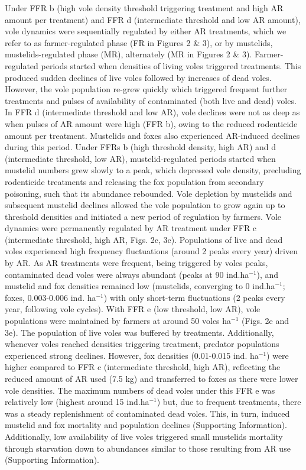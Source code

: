 \documentclass[11pt]{article}
\begin{document}
Under FFR b (high vole density threshold triggering treatment and high AR amount per treatment) and FFR d (intermediate threshold and low AR amount), vole dynamics were sequentially regulated by either AR treatments, which we refer to as farmer-regulated phase (FR in Figures 2 \& 3), or by mustelids, mustelids-regulated phase (MR), alternately (MR in Figures 2 \& 3). Farmer-regulated periods started when densities of living voles triggered treatments. This produced sudden declines of live voles followed by increases of dead voles. However, the vole population re-grew quickly which triggered frequent further treatments and pulses of availability of contaminated (both live and dead) voles. In FFR d (intermediate threshold and low AR), vole declines were not as deep as when pulses of AR amount were high (FFR b), owing to the reduced rodenticide amount per treatment. Mustelids and foxes also experienced AR-induced declines during this period. Under FFRs b (high threshold density, high AR) and d (intermediate threshold, low AR), mustelid-regulated periods started when mustelid numbers grew slowly to a peak, which depressed vole density, precluding rodenticide treatments and releasing the fox population from secondary poisoning, such that its abundance rebounded. Vole depletion by mustelids and subsequent mustelid declines allowed the vole population to grow again up to threshold densities and initiated a new period of regulation by farmers.
Vole dynamics were permanently regulated by AR treatment under FFR c (intermediate threshold, high AR, Figs. 2c, 3c). Populations of live and dead voles experienced high frequency fluctuations (around 2 peaks every year) driven by AR. As AR treatments were frequent, being triggered by voles peaks, contaminated dead voles were always abundant (peaks at 90 ind.ha$^{-1}$), and mustelid and fox densities remained low (mustelids, converging to 0 ind.ha$^{-1}$; foxes, 0.003-0.006 ind. ha$^{-1}$) with only short-term fluctuations (2 peaks every year, following vole cycles).
With FFR e (low threshold, low AR), vole populations were maintained by farmers at around 50 voles ha$^{-1}$ (Figs. 2e and 3e). The population of live voles was buffered by treatments. Additionally, whenever voles reached densities triggering treatment, predator populations experienced strong declines. However, fox densities (0.01-0.015 ind. ha$^{-1}$) were higher compared to FFR c (intermediate threshold, high AR), reflecting the reduced amount of AR used (7.5 kg) and transferred to foxes as there were lower vole densities. The maximum numbers of dead voles under this FFR e was relatively low (highest around 15 ind.ha$^{-1}$) but, due to frequent treatments, there was a steady replenishment of contaminated dead voles. This, in turn, induced mustelid and fox mortality and population declines (Supporting Information). Additionally, low availability of live voles triggered small mustelids mortality through starvation down to abundances similar to those resulting from AR use (Supporting Information). 
\end{document}
